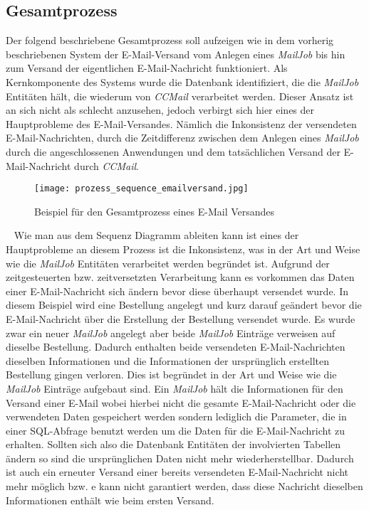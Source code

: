 \subsection{Gesamtprozess}
\label{sec:gesamtprozess}
Der folgend beschriebene Gesamtprozess soll aufzeigen wie in dem vorherig beschriebenen System der E-Mail-Versand vom Anlegen eines \emph{MailJob} bis hin zum Versand der eigentlichen E-Mail-Nachricht funktioniert. Als Kernkomponente des Systems wurde die Datenbank identifiziert, die die \emph{MailJob} Entitäten hält, die wiederum von \emph{CCMail} verarbeitet werden. Dieser Ansatz ist an sich nicht als schlecht anzusehen, jedoch verbirgt sich hier eines der Hauptprobleme des E-Mail-Versandes. Nämlich die Inkonsistenz der versendeten E-Mail-Nachrichten, durch die Zeitdifferenz zwischen dem Anlegen eines \emph{MailJob} durch die angeschlossenen Anwendungen und dem tatsächlichen Versand der E-Mail-Nachricht durch \emph{CCMail}.
\begin{figure}[h]
\centering
\texttt{[image: prozess\_sequence\_emailversand.jpg]}
\caption{Beispiel für den Gesamtprozess eines E-Mail Versandes}
\label{fig:sequence-diagramm-gesamtprozess}
\end{figure}
\ \newline
Wie man aus dem Sequenz Diagramm ableiten kann ist eines der Hauptprobleme an diesem Prozess ist die Inkonsistenz, was in der Art und Weise wie die \emph{MailJob} Entitäten verarbeitet werden begründet ist. Aufgrund der zeitgesteuerten bzw. zeitversetzten Verarbeitung kann es vorkommen das Daten einer E-Mail-Nachricht sich ändern bevor diese überhaupt versendet wurde. In diesem Beispiel wird eine Bestellung angelegt und kurz darauf geändert bevor die E-Mail-Nachricht über die Erstellung der Bestellung versendet wurde. Es wurde zwar ein neuer \emph{MailJob} angelegt aber beide \emph{MailJob} Einträge verweisen auf dieselbe Bestellung. Dadurch enthalten beide versendeten E-Mail-Nachrichten dieselben Informationen und die Informationen der ursprünglich erstellten Bestellung gingen verloren. 
\newline
\newline
Dies ist begründet in der Art und Weise wie die \emph{MailJob} Einträge aufgebaut sind. Ein \emph{MailJob} hält die Informationen für den Versand einer E-Mail wobei hierbei nicht die gesamte E-Mail-Nachricht oder die verwendeten Daten gespeichert werden sondern lediglich die Parameter, die in einer SQL-Abfrage benutzt werden um die Daten für die E-Mail-Nachricht zu erhalten. Sollten sich also die Datenbank Entitäten der involvierten Tabellen ändern so sind die ursprünglichen Daten nicht mehr wiederherstellbar. Dadurch ist auch ein erneuter Versand einer bereits versendeten E-Mail-Nachricht nicht mehr möglich bzw. e kann nicht garantiert werden, dass diese Nachricht dieselben Informationen enthält wie beim ersten Versand.
